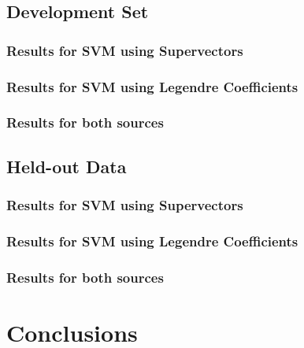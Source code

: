 \documentclass[11pt,a4paper]{tesis}
\begin{document}
	\section{Development Set}
		\subsection{Results for SVM using Supervectors}
			
		\subsection{Results for SVM using Legendre Coefficients}
			
		\subsection{Results for both sources}
			
	\section{Held-out Data}
		\subsection{Results for SVM using Supervectors}
		\subsection{Results for SVM using Legendre Coefficients}
		\subsection{Results for both sources}
\chapter{Conclusions}
 
\end{document}
